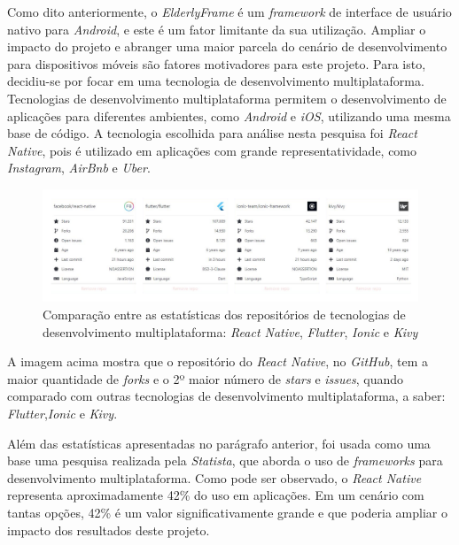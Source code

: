 \documentclass[
	12pt,				    %
	openright,			    %
	oneside,			    %
	a4paper,			    %
    sumario=tradicional,    %
	english,			    %
	brazil,				    %
	]{abntex2}              %
\begin{document}
\par

Como dito anteriormente, o \textit{ElderlyFrame} é um \textit{framework} de interface de usuário nativo para \textit{Android}, e este é um fator limitante da sua utilização. Ampliar o impacto do projeto e abranger uma maior parcela do cenário de desenvolvimento para dispositivos móveis são fatores motivadores para este projeto. Para isto, decidiu-se por focar em uma tecnologia de desenvolvimento multiplataforma. Tecnologias de desenvolvimento multiplataforma permitem o desenvolvimento de aplicações para diferentes ambientes, como \emph{Android} e \emph{iOS}, utilizando uma mesma base de código. A tecnologia escolhida para análise nesta pesquisa foi \textit{React Native}, pois é utilizado em aplicações com grande representatividade, como \textit{Instagram}, \textit{AirBnb} e \textit{Uber}.

\begin{figure}[H]
	\begin{center}
		\includegraphics[width=1\linewidth]{images/github-compare.png}
	\end{center}
	\caption[Comparativo de estatísticas dos repositórios de tecnologias de desenvolvimento multiplataforma]{Comparação entre as estatísticas dos repositórios de tecnologias de desenvolvimento multiplataforma: \textit{React Native}, \textit{Flutter}, \textit{Ionic} e \textit{Kivy}}
	\label{fig:githubCompare}
\end{figure}

A imagem acima mostra que o repositório do \textit{React Native}, no \textit{GitHub}, tem a maior quantidade de \textit{forks} e o 2º maior número de \textit{stars} e \textit{issues}, quando comparado com outras tecnologias de desenvolvimento multiplataforma, a saber: \textit{Flutter},\textit{Ionic} e \textit{Kivy}.

Além das estatísticas apresentadas no parágrafo anterior, foi usada como uma base uma pesquisa realizada pela \textit{Statista}, que aborda o uso de \textit{frameworks} para desenvolvimento multiplataforma. Como pode ser observado, o \textit{React Native} representa aproximadamente 42\% do uso em aplicações. Em um cenário com tantas opções, 42\% é um valor significativamente grande e que poderia ampliar o impacto dos resultados deste projeto.
\end{document}
